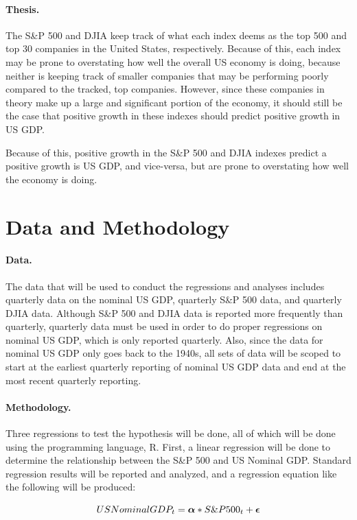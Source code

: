 \documentclass[11pt]{article}
\numberwithin{equation}{section}
\def\alp{\mbox{\boldmath$\alpha$\unboldmath}}
\def\epsi{\mbox{\boldmath$\epsilon$\unboldmath}}
\begin{document}
\paragraph{Thesis.}
The S\&P 500 and DJIA keep track of what each index deems as the top 500 and top 30 companies in the United States, respectively. Because of this, each index may be prone to overstating how well the overall US economy is doing, because neither is keeping track of smaller companies that may be performing poorly compared to the tracked, top companies. However, since these companies in theory make up a large and significant portion of the economy, it should still be the case that positive growth in these indexes should predict positive growth in US GDP.

Because of this, positive growth in the S\&P 500 and DJIA indexes predict a positive growth is US GDP, and vice-versa, but are prone to overstating how well the economy is doing.

\section{Data and Methodology}

\paragraph{Data.} 
The data that will be used to conduct the regressions and analyses includes quarterly data on the nominal US GDP, quarterly S\&P 500 data, and quarterly DJIA data. Although S\&P 500 and DJIA data is reported more frequently than quarterly, quarterly data must be used in order to do proper regressions on nominal US GDP, which is only reported quarterly. Also, since the data for nominal US GDP only goes back to the 1940s, all sets of data will be scoped to start at the earliest quarterly reporting of nominal US GDP data and end at the most recent quarterly reporting.

\paragraph{Methodology.}
Three regressions to test the hypothesis will be done, all of which will be done using the programming language, R. First, a linear regression will be done to determine the relationship between the S\&P 500 and US Nominal GDP. Standard regression results will be reported and analyzed, and a regression equation like the following will be produced:

\[ US Nominal GDP_{t} = \alp*S\&P500_{t} + \epsi \]
\end{document}
